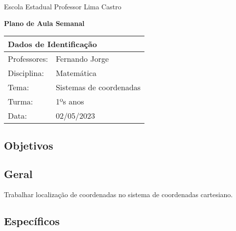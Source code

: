 \documentclass[oneside,a4paper,12pt]{article}
\newcommand{\universidade}{Escola Estadual Professor Lima Castro}
\newcommand{\professores}{Fernando Jorge}
\newcommand{\disciplina}{Matemática}
\newcommand{\tema}{Sistemas de coordenadas}
\newcommand{\turma}{1ºs anos}
\newcommand{\data}{02/05/2023}
\begin{document}
  \pagestyle{empty}

	\begin{center}
	
	  \universidade
	  \par
	  \vspace{10pt}
	  \LARGE \textbf{Plano de Aula Semanal}

	\end{center}

  \vspace{10pt}

	\begin{tabular}{ |l|p{12cm}| }

	  \hline
	  \multicolumn{2}{|l|}{\textbf{Dados de Identificação}} \\
	  \hline
	  Professores:         &    \professores           \\
	  \hline
	  Disciplina:        &    \disciplina          \\
	  \hline
	  Tema:              &    \tema                \\
	  \hline
	  Turma:             &    \turma               \\
	  \hline
	  Data:              &    \data                \\
	  \hline

	\end{tabular}

  \begin{snugshade}
  \section{Objetivos} %
  \end{snugshade}
  
  \subsection{Geral} %

  Trabalhar localização de coordenadas no sistema de coordenadas cartesiano.
    
  \subsection{Específicos} %
    
\end{document}
